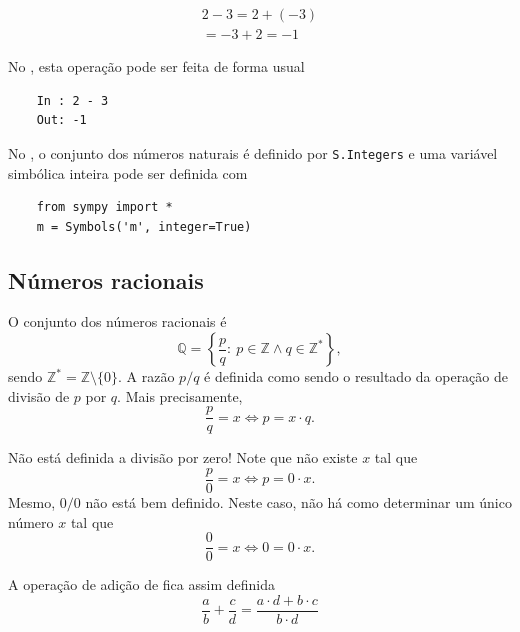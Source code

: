\begin{ex}
  \begin{gather}
    2 - 3 = 2 + (-3) \\
    = -3 + 2 = -1
  \end{gather}

  \ifispython
  No \python, esta operação pode ser feita de forma usual
  \begin{lstlisting}
    In : 2 - 3
    Out: -1
  \end{lstlisting}
  \fi
\end{ex}

\ifispython
\begin{obs}
  No \sympy, o conjunto dos números naturais é definido por \lstinline!S.Integers! e uma variável simbólica inteira pode ser definida com
  \begin{lstlisting}
    from sympy import *
    m = Symbols('m', integer=True)
  \end{lstlisting}
\end{obs}
\fi

\subsection{Números racionais}

O conjunto dos números racionais é
\begin{equation}
  \mathbb{Q} = \left\{\frac{p}{q}:~p\in\mathbb{Z}\land q\in\mathbb{Z}^*\right\},
\end{equation}
sendo $\mathbb{Z}^*=\mathbb{Z}\setminus\{0\}$. A razão $p/q$ é definida como sendo o resultado da operação de divisão de $p$ por $q$. Mais precisamente,
\begin{equation}
  \frac{p}{q} = x \Leftrightarrow p = x\cdot q.
\end{equation}

\begin{obs}
  Não está definida a divisão por zero! Note que não existe $x$ tal que
  \begin{equation}
    \frac{p}{0} = x \Leftrightarrow p = 0\cdot x.
  \end{equation}
  Mesmo, $0/0$ não está bem definido. Neste caso, não há como determinar um único número $x$ tal que
  \begin{equation}
    \frac{0}{0} = x \Leftrightarrow 0 = 0\cdot x.
  \end{equation}
\end{obs}

A operação de adição de fica assim definida
\begin{equation}
  \frac{a}{b} + \frac{c}{d} = \frac{a\cdot d + b\cdot c}{b\cdot d}
\end{equation}

